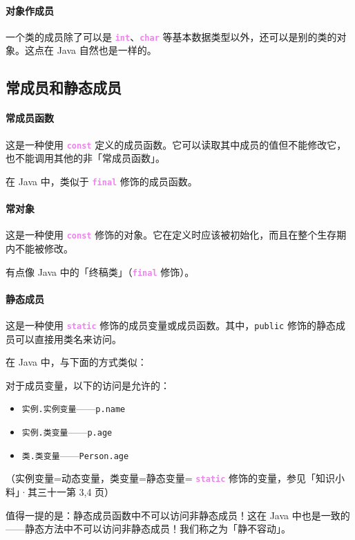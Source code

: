 \documentclass[UTF8]{ctexart}
\newcommand\Emph[1]{\colorbox{green!10}{\textcolor{green!30!black}{#1}}}
\newcommand\keyword[1]{\textcolor{violet}{\textbf{\texttt{#1}}}}
\begin{document}
\paragraph{对象作成员} 一个类的成员除了可以是 \keyword{int}、\keyword{char} 等基本数据类型以外，还可以是别的类的对象。这点在 Java 自然也是一样的。

\subsection{常成员和静态成员}
\paragraph{常成员函数} 这是一种使用 \keyword{const} 定义的成员函数。它可以读取其中成员的值但不能修改它，也不能调用其他的非「常成员函数」。

在 Java 中，类似于 \keyword{final} 修饰的成员函数。

\paragraph{常对象} 这是一种使用 \keyword{const} 修饰的对象。它在定义时应该被初始化，而且在整个生存期内不能被修改。

有点像 Java 中的「终稿类」（\keyword{final} 修饰）。

\paragraph{静态成员} 这是一种使用 \keyword{static} 修饰的成员变量或成员函数。其中，\verb!public! 修饰的静态成员可以直接用类名来访问。

在 Java 中，与下面的方式类似：
\begin{tcolorbox}[colback=cyan!10, colframe=cyan, arc=1pt]
    对于成员变量，以下的访问是允许的：
    \begin{itemize}[itemsep=0pt,parsep=0pt]
        \item \verb!实例.实例变量!——\verb!p.name!
        \item \verb!实例.类变量!——\verb!p.age!
        \item \verb!类.类变量!——\verb!Person.age!
    \end{itemize}
    （实例变量=动态变量，类变量=静态变量= \keyword{static} 修饰的变量，参见「知识小料」·其三十一第 3,4 页）
\end{tcolorbox}

值得一提的是：静态成员函数中不可以访问非静态成员！这在 Java 中也是一致的——\Emph{静态方法中不可以访问非静态成员！}我们称之为「静不容动」。
\end{document}
